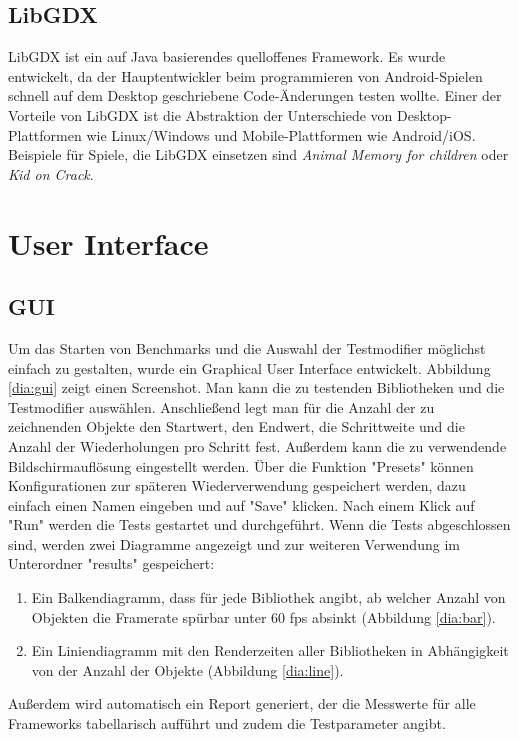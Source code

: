 \subsection{LibGDX}
LibGDX ist ein auf Java basierendes quelloffenes Framework. Es wurde entwickelt, da der Hauptentwickler beim programmieren von Android-Spielen schnell auf dem Desktop geschriebene Code-Änderungen testen wollte. Einer der Vorteile von LibGDX ist die Abstraktion der Unterschiede von Desktop-Plattformen wie Linux/Windows und Mobile-Plattformen wie Android/iOS. Beispiele für Spiele, die LibGDX einsetzen sind \emph{Animal Memory for children} oder \emph{Kid on Crack}.

\section{User Interface}
\subsection{GUI}
Um das Starten von Benchmarks und die Auswahl der Testmodifier möglichst einfach zu gestalten, wurde ein Graphical User Interface entwickelt. Abbildung \ref{dia:gui} zeigt einen Screenshot. Man kann die zu testenden Bibliotheken und die Testmodifier auswählen. Anschließend legt man für die Anzahl der zu zeichnenden Objekte den Startwert, den Endwert, die Schrittweite und die Anzahl der Wiederholungen pro Schritt fest. Außerdem kann die zu verwendende Bildschirmauflösung eingestellt werden. Über die Funktion "Presets" können Konfigurationen zur späteren Wiederverwendung gespeichert werden, dazu einfach einen Namen eingeben und auf "Save" klicken. Nach einem Klick auf "Run" werden die Tests gestartet und durchgeführt. Wenn die Tests abgeschlossen sind, werden zwei Diagramme angezeigt und zur weiteren Verwendung im Unterordner "results" gespeichert: 
\begin{enumerate}
\item Ein Balkendiagramm, dass für jede Bibliothek angibt, ab welcher Anzahl von Objekten die Framerate spürbar unter 60 fps absinkt (Abbildung \ref{dia:bar}).
\item Ein Liniendiagramm mit den Renderzeiten aller Bibliotheken in Abhängigkeit von der Anzahl der Objekte (Abbildung \ref{dia:line}).
\end{enumerate}
Außerdem wird automatisch ein Report generiert, der die Messwerte für alle Frameworks tabellarisch aufführt und zudem die Testparameter angibt.

